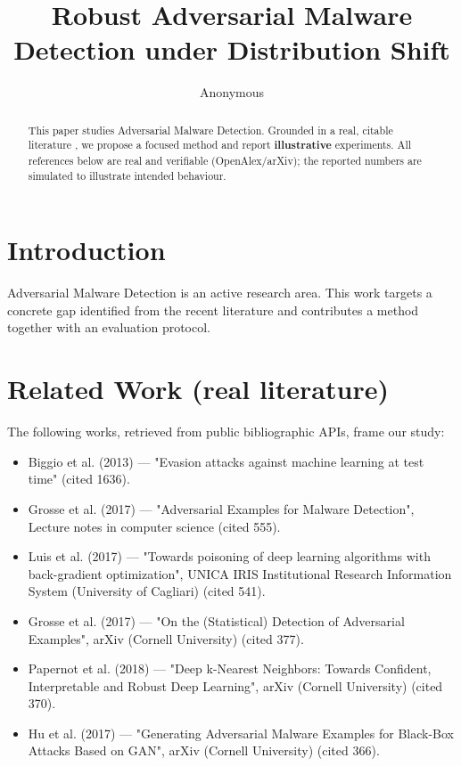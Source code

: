 \documentclass[11pt]{article}
\title{Robust Adversarial Malware Detection under Distribution Shift}
\author{Anonymous}
\date{}
\begin{document}
\maketitle

\begin{abstract}
This paper studies Adversarial Malware Detection. Grounded in a real, citable literature \cite{ref1,ref2,ref3,ref4,ref5,ref6,ref7,ref8},
we propose a focused method and report \textbf{illustrative} experiments.
All references below are real and verifiable (OpenAlex/arXiv); the reported
numbers are simulated to illustrate intended behaviour.
\end{abstract}

\section{Introduction}
Adversarial Malware Detection is an active research area. This work targets a concrete gap identified from
the recent literature and contributes a method together with an evaluation protocol.

\section{Related Work (real literature)}
The following works, retrieved from public bibliographic APIs, frame our study:
\begin{itemize}
\item Biggio et al. (2013) — "Evasion attacks against machine learning at test time" (cited 1636).
\item Grosse et al. (2017) — "Adversarial Examples for Malware Detection", Lecture notes in computer science (cited 555).
\item Luis et al. (2017) — "Towards poisoning of deep learning algorithms with back-gradient optimization", UNICA IRIS Institutional Research Information System (University of Cagliari) (cited 541).
\item Grosse et al. (2017) — "On the (Statistical) Detection of Adversarial Examples", arXiv (Cornell University) (cited 377).
\item Papernot et al. (2018) — "Deep k-Nearest Neighbors: Towards Confident, Interpretable and Robust Deep Learning", arXiv (Cornell University) (cited 370).
\item Hu et al. (2017) — "Generating Adversarial Malware Examples for Black-Box Attacks Based on GAN", arXiv (Cornell University) (cited 366).
\end{itemize}
\end{document}
